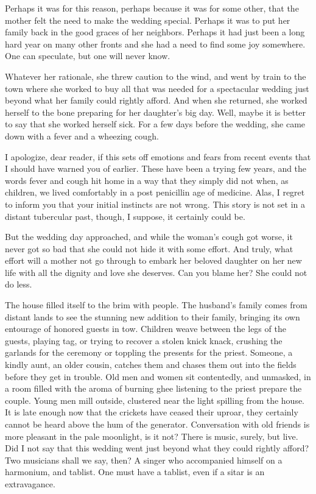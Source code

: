 \documentclass{amsart}
\begin{document}
Perhaps it was for this reason, perhaps because it was for some other, that the mother felt the need to make the wedding special. Perhaps it was to put her family back in the good graces of her neighbors. Perhaps it had just been a long hard year on many other fronts and she had a need to find some joy somewhere. One can speculate, but one will never know. 

Whatever her rationale, she threw caution to the wind, and went by train to the town where she worked to buy all that was needed for a spectacular wedding just beyond what her family could rightly afford. And when she returned, she worked herself to the bone preparing for her daughter's big day. Well, maybe it is better to say that she worked herself sick. For a few days before the wedding, she came down with a fever and a wheezing cough. 

I apologize, dear reader, if this sets off emotions and fears from recent events that I should have warned you of earlier. These have been a trying few years, and the words fever and cough hit home in a way that they simply did not when, as children, we lived comfortably in a post penicillin age of medicine. Alas, I regret to inform you that your initial instincts are not wrong. This story is not set in a distant tubercular past, though, I suppose, it certainly could be.

But the wedding day approached, and while the woman's cough got worse, it never got so bad that she could not hide it with some effort. And truly, what effort will a mother not go through to embark her beloved daughter on her new life with all the dignity and love she deserves. Can you blame her? She could not do less. 

The house filled itself to the brim with people. The husband's family comes from distant lands to see the stunning new addition to their family, bringing its own entourage of honored guests in tow. Children weave between the legs of the guests, playing tag, or trying to recover a stolen knick knack, crushing the garlands for the ceremony or toppling the presents for the priest. Someone, a kindly aunt, an older cousin, catches them and chases them out into the fields before they get in trouble. Old men and women sit contentedly, and unmasked, in a room filled with the aroma of burning ghee listening to the priest prepare the couple. Young men mill outside, clustered near the light spilling from the house. It is late enough now that the crickets have ceased their uproar, they certainly cannot be heard above the hum of the generator. Conversation with old friends is more pleasant in the pale moonlight, is it not? There is music, surely, but live. Did I not say that this wedding went just beyond what they could rightly afford? Two musicians shall we say, then? A singer who accompanied himself on a harmonium, and tablist. One must have a tablist, even if a sitar is an extravagance. 
\end{document}
